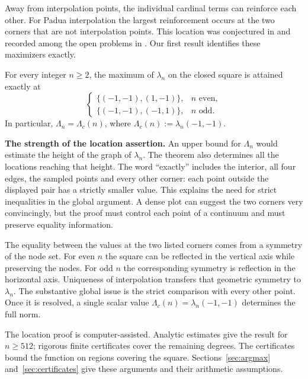 Away from interpolation points, the individual cardinal terms can reinforce each other.
For Padua interpolation the largest reinforcement occurs at the two corners
that are not interpolation points. This location was conjectured in
\cite{CaliariDeMarchiSommarivaVianello2008poster} and recorded among the
open problems in \cite[Section~3.3]{DeMarchi2022}.
Our first result identifies these maximizers exactly.

\begin{theorem}\label{thm:main-location}
For every integer $n\geq2$, the maximum of $\lambda_n$ on the closed square
is attained exactly at
\[
 \begin{cases}
 \{(-1,-1),(1,-1)\},&n\text{ even},\\
 \{(-1,-1),(-1,1)\},&n\text{ odd}.
 \end{cases}
\]
In particular, $\Lambda_n=\Lambda_c(n)$, where
$\Lambda_c(n):=\lambda_n(-1,-1)$.
\end{theorem}

\noindent\textbf{The strength of the location assertion.}
An upper bound for $\Lambda_n$ would estimate the height of the graph
of $\lambda_n$. The theorem also determines all the locations reaching
that height. The word ``exactly'' includes the interior, all four edges,
the sampled points and every other corner: each point outside the
displayed pair has a strictly smaller value. This explains the need for
strict inequalities in the global argument. A dense plot can suggest
the two corners very convincingly, but the proof must control each
point of a continuum and must preserve equality information.

The equality between the values at the two listed corners comes from
a symmetry of the node set. For even $n$ the square can be reflected
in the vertical axis while preserving the nodes. For odd $n$ the
corresponding symmetry is reflection in the horizontal axis. Uniqueness
of interpolation transfers that geometric symmetry to $\lambda_n$.
The substantive global issue is the strict comparison with every other
point. Once it is resolved, a single scalar value
$\Lambda_c(n)=\lambda_n(-1,-1)$ determines the full norm.

The location proof is computer-assisted. Analytic estimates give the result
for $n\geq512$; rigorous finite certificates cover the remaining degrees.
The certificates bound the function on regions covering the square.
Sections~\ref{sec:argmax} and~\ref{sec:certificates} give these arguments
and their arithmetic assumptions.

